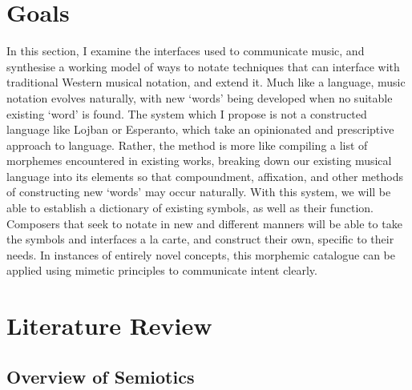 
\renewcommand*{\thefootnote}{\arabic{footnote}}
\setcounter{footnote}{0}
\section{Goals}

In this section, I examine the interfaces used to communicate music, and synthesise a working model of ways to notate techniques that can interface with traditional Western musical notation, and extend it.
Much like a language, music notation evolves naturally, with new `words' being developed when no suitable existing `word' is found.
The system which I propose is not a constructed language like Lojban or Esperanto, which take an opinionated and prescriptive approach to language. 
Rather, the method is more like compiling a list of morphemes encountered in existing works, breaking down our existing musical language into its elements so that compoundment, affixation, and other methods of constructing new `words' may occur naturally.
With this system, we will be able to establish a dictionary of existing symbols, as well as their function.
Composers that seek to notate in new and different manners will be able to take the symbols and interfaces a la carte, and construct their own, specific to their needs.
In instances of entirely novel concepts, this morphemic catalogue can be applied using mimetic principles to communicate intent clearly.

\section{Literature Review}

\subsection{Overview of Semiotics}

